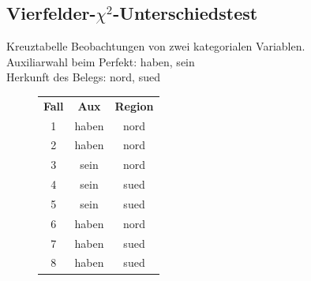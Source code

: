 \subsection[$\chi^2$ (Unterschied)]{Vierfelder-$\chi^2$-Unterschiedstest}

\begin{frame}{Kreuztabelle}
  Beobachtungen von zwei \alert{kategorialen Variablen}.\\
  Auxiliarwahl beim Perfekt: haben, sein\\
  Herkunft des Belegs: nord, sued\\

\begin{figure}[h]
  \centering
  \begin{tabular}{ccc}
    \textbf{Fall} & \textbf{Aux} & \textbf{Region} \\
          1       & haben        & nord   \\
          2       & haben        & nord   \\
          3       & sein         & nord  \\
          4       & sein         & sued  \\
          5       & sein         & sued   \\
          6       & haben        & nord   \\
          7       & haben        & sued   \\
          8       & haben        & sued  \\             
  \end{tabular}
\end{figure}
\end{frame}



